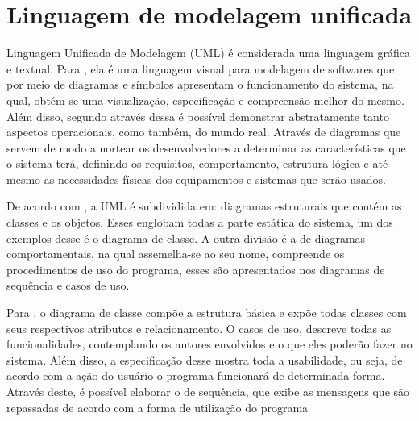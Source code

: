 \section{Linguagem de modelagem unificada}
\label{sec:uml}
Linguagem Unificada de Modelagem (UML) é considerada uma linguagem gráfica e textual. Para \citet{guedes2009}, ela é uma linguagem visual para modelagem de softwares que por meio de diagramas e símbolos apresentam o funcionamento do sistema, na qual, obtém-se uma visualização, especificação e compreensão melhor do mesmo. Além disso, segundo \cite{gudwin2010} através dessa é possível demonstrar abstratamente tanto aspectos operacionais, como também, do mundo real. Através de diagramas que servem de modo a nortear os desenvolvedores a determinar as características que o sistema terá, definindo os requisitos, comportamento, estrutura lógica e até mesmo as necessidades físicas dos equipamentos e sistemas que serão usados. 

De acordo com \cite{gudwin2010}, a UML é subdividida em: diagramas estruturais que contém as classes e os objetos. Esses englobam todas a parte estática do sistema, um dos exemplos desse é o diagrama de classe. A outra divisão é a de diagramas comportamentais, na qual assemelha-se ao seu nome, compreende os procedimentos de uso do programa, esses são apresentados nos diagramas de sequência e casos de uso. 
 
Para \cite{benhur2015}, o diagrama de classe compõe a estrutura básica e expõe todas classes com seus respectivos atributos e relacionamento. O casos de uso, descreve todas as funcionalidades, contemplando os autores envolvidos e o que eles poderão fazer no sistema. Além disso, a especificação desse mostra toda a usabilidade, ou seja, de acordo com a ação do usuário o programa funcionará de determinada forma. Através deste, é possível elaborar o de sequência, que exibe as mensagens que são repassadas de acordo com a forma de utilização do programa



















